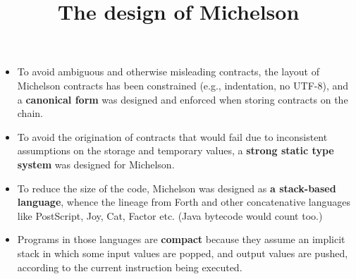 \documentclass[wide]{slides}
\begin{document}
\begin{slide}
  \title{The design of Michelson}

  \begin{itemize}

    \item To avoid ambiguous and otherwise misleading contracts, the
      layout of Michelson contracts has been constrained (e.g.,
      indentation, no UTF-8), and a \textbf{canonical form} was
      designed and enforced when storing contracts on the chain.

    \item To avoid the origination of contracts that would fail due to
      inconsistent assumptions on the storage and temporary values, a
      \textbf{strong static type system} was designed for Michelson.

    \item To reduce the size of the code, Michelson was designed as
      \textbf{a stack-based language}, whence the lineage from Forth
      and other concatenative languages like PostScript, Joy, Cat,
      Factor etc. (Java bytecode would count too.)

    \item Programs in those languages are \textbf{compact} because
      they assume an implicit stack in which some input values are
      popped, and output values are pushed, according to the current
      instruction being executed.

  \end{itemize}

\end{slide}
\end{document}
